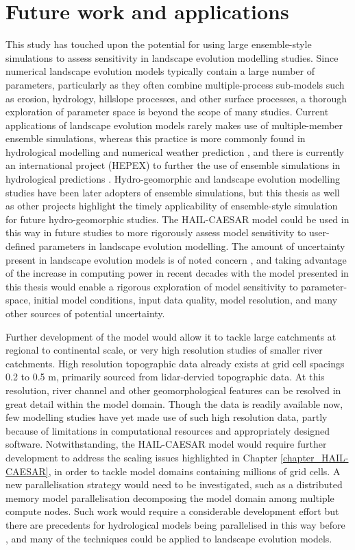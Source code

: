 \section{Future work and applications}
This study has touched upon the potential for using large ensemble-style simulations to assess sensitivity in landscape evolution modelling studies. Since numerical landscape evolution models typically contain a large number of parameters, particularly as they often combine multiple-process sub-models such as erosion, hydrology, hillslope processes, and other surface processes, a thorough exploration of parameter space is beyond the scope of many studies. Current applications of landscape evolution models rarely makes use of multiple-member ensemble simulations, whereas this practice is more commonly found in hydrological modelling \citep{cloke2009ensemble,wong2015sensitivity} and numerical weather prediction \citep{sivillo1997ensemble}, and there is currently an international project (HEPEX) to further the use of ensemble simulations in hydrological predictions \citep{schaake2007hepex}. Hydro-geomorphic and landscape evolution modelling studies have been later adopters of ensemble simulations, but this thesis as well as other projects \citep[e.g.][]{skinner2017lemsi} highlight the timely applicability of ensemble-style simulation for future hydro-geomorphic studies. The HAIL-CAESAR model could be used in this way in future studies to more rigorously assess model sensitivity to user-defined parameters in landscape evolution modelling. The amount of uncertainty present in landscape evolution models is of noted concern \citep{pelletier2015forecasting}, and taking advantage of the increase in computing power in recent decades with the model presented in this thesis would enable a rigorous exploration of model sensitivity to parameter-space, initial model conditions, input data quality, model resolution, and many other sources of potential uncertainty.

Further development of the model would allow it to tackle large catchments at regional to continental scale, or very high resolution studies of smaller river catchments. High resolution topographic data already exists at grid cell spacings 0.2 to 0.5 m, primarily sourced from lidar-dervied topographic data. At this resolution, river channel and other geomorphological features can be resolved in great detail within the model domain. Though the data is readily available now, few modelling studies have yet made use of such high resolution data, partly because of limitations in computational resources and appropriately designed software. Notwithstanding, the HAIL-CAESAR model would require further development to address the scaling issues highlighted in Chapter \ref{chapter_HAIL-CAESAR}, in order to tackle model domains containing millions of grid cells. A new parallelisation strategy would need to be investigated, such as a distributed memory model parallelisation decomposing the model domain among multiple compute nodes. Such work would require a considerable development effort but there are precedents for hydrological models being parallelised in this way before \citep{vivoni2011real}, and many of the techniques could be applied to landscape evolution models.
 
